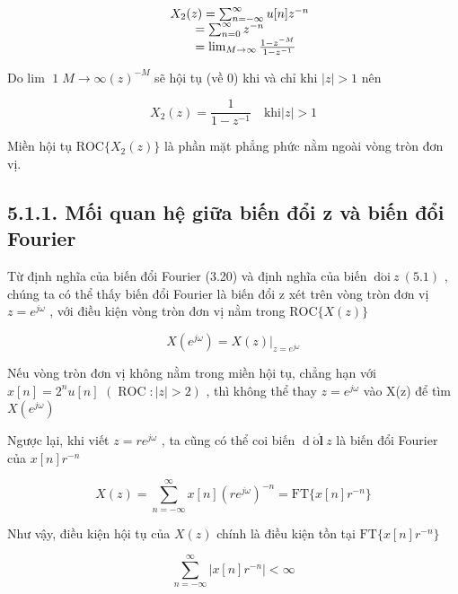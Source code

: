 \documentclass[
  10
]{article}
\begin{document}
\[
\begin{array}{r l} & X _ {2} (z) = \sum_ {n = - \infty} ^ {\infty} u [ n ] z ^ {- n} \\ & \qquad = \sum_ {n = 0} ^ {\infty} z ^ {- n} \\ & \qquad = \lim _ {M \to \infty} \frac {1 - z ^ {- M}}{1 - z ^ {- 1}} \end{array}
\]

Do lim
\(\scriptstyle { \operatorname { 1 } } M \to \infty { \left( z \right) } ^ { - M }\)
sẽ hội tụ (về 0) khi và chỉ khi \(| z | > 1\) nên

\[
X _ {2} (z) = \frac {1}{1 - z ^ {- 1}} \quad \mathrm{khi} | z | > 1
\]

Miền hội tụ \(\mathrm { R O C } \{ X _ { 2 } ( z ) \}\) là phần mặt
phẳng phức nằm ngoài vòng tròn đơn vị. 

\subsection{5.1.1. Mối quan hệ giữa biến đổi z và biến đổi
Fourier}\label{mux1ed1i-quan-hux1ec7-giux1eefa-biux1ebfn-ux111ux1ed5i-z-vuxe0-biux1ebfn-ux111ux1ed5i-fourier}

Từ định nghĩa của biến đổi Fourier (3.20) và định nghĩa của biến
\(\mathrm { { \ d } } \mathrm { { \acute { o } i } } \ z \ ( 5 . 1 )\) ,
chúng ta có thể thấy biến đổi Fourier là biến đổi z xét trên vòng tròn
đơn vị \(z = e ^ { j \omega }\) , với điều kiện vòng tròn đơn vị nằm
trong \(\mathrm { R O C } \{ X ( z ) \}\)

\[
X (e ^ {j \omega}) = X (z) | _ {z = e ^ {j \omega}}\tag{5.2}
\]

Nếu vòng tròn đơn vị không nằm trong miền hội tụ, chẳng hạn với
\(x [ n ] = 2 ^ { n } u [ n ]\)
\(\left( \operatorname { R O C } \colon | z | > 2 \right)\) , thì không
thể thay \(z = e ^ { j \omega }\) vào X(z) để tìm
\(X ( e ^ { j \omega } )\)

Ngược lại, khi viết \(z = r e ^ { j \omega }\) , ta cũng có thể coi biến
\(\operatorname { d } \acute { \boldsymbol { \mathrm { o } } } \acute { \mathbf { l } } ~ z\)
là biến đổi Fourier của \(x [ n ] r ^ { - n }\)

\[
X (z) = \sum_ {n = - \infty} ^ {\infty} x [ n ] (r e ^ {j \omega}) ^ {- n} = \mathrm{FT} \{x [ n ] r ^ {- n} \}\tag{5.3}
\]

Như vậy, điều kiện hội tụ của \(X ( z )\) chính là điều kiện tồn tại
\(\mathrm { F T } \{ x [ n ] r ^ { - n } \}\)

\[
\sum_ {n = - \infty} ^ {\infty} | x [ n ] r ^ {- n} | <   \infty\tag{5.4}
\]
\end{document}
